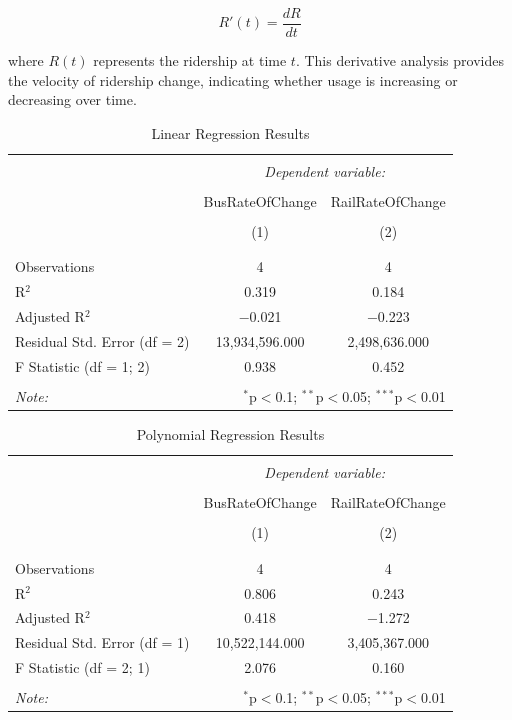 \documentclass[
]{article}
\begin{document}
\[
R'(t) = \frac{dR}{dt}
\]

where \(R(t)\) represents the ridership at time \(t\). This derivative
analysis provides the velocity of ridership change, indicating whether
usage is increasing or decreasing over time.

\begin{table}[!htbp] \centering 
  \caption{Linear Regression Results} 
  \label{} 
\begin{tabular}{@{\extracolsep{5pt}}lcc} 
\\[-1.8ex]\hline 
\hline \\[-1.8ex] 
 & \multicolumn{2}{c}{\textit{Dependent variable:}} \\ 
\cline{2-3} 
\\[-1.8ex] & BusRateOfChange & RailRateOfChange \\ 
\\[-1.8ex] & (1) & (2)\\ 
\hline \\[-1.8ex] 
\hline \\[-1.8ex] 
Observations & 4 & 4 \\ 
R$^{2}$ & 0.319 & 0.184 \\ 
Adjusted R$^{2}$ & $-$0.021 & $-$0.223 \\ 
Residual Std. Error (df = 2) & 13,934,596.000 & 2,498,636.000 \\ 
F Statistic (df = 1; 2) & 0.938 & 0.452 \\ 
\hline 
\hline \\[-1.8ex] 
\textit{Note:}  & \multicolumn{2}{r}{$^{*}$p$<$0.1; $^{**}$p$<$0.05; $^{***}$p$<$0.01} \\ 
\end{tabular} 
\end{table}

\begin{table}[!htbp] \centering 
  \caption{Polynomial Regression Results} 
  \label{} 
\begin{tabular}{@{\extracolsep{5pt}}lcc} 
\\[-1.8ex]\hline 
\hline \\[-1.8ex] 
 & \multicolumn{2}{c}{\textit{Dependent variable:}} \\ 
\cline{2-3} 
\\[-1.8ex] & BusRateOfChange & RailRateOfChange \\ 
\\[-1.8ex] & (1) & (2)\\ 
\hline \\[-1.8ex] 
\hline \\[-1.8ex] 
Observations & 4 & 4 \\ 
R$^{2}$ & 0.806 & 0.243 \\ 
Adjusted R$^{2}$ & 0.418 & $-$1.272 \\ 
Residual Std. Error (df = 1) & 10,522,144.000 & 3,405,367.000 \\ 
F Statistic (df = 2; 1) & 2.076 & 0.160 \\ 
\hline 
\hline \\[-1.8ex] 
\textit{Note:}  & \multicolumn{2}{r}{$^{*}$p$<$0.1; $^{**}$p$<$0.05; $^{***}$p$<$0.01} \\ 
\end{tabular} 
\end{table}
\end{document}
